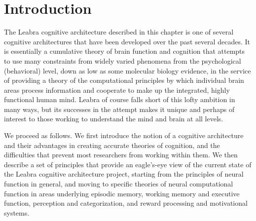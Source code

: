 \documentclass[11pt,twoside]{article}
\begin{document}
 
\titlesamepageoc{\mytitle}{\myauthor}{\mynote}{\myabstract}



\pagestyle{myheadings}

\section{Introduction}

The Leabra cognitive architecture described in this chapter is one of several
cognitive architectures that have been developed over the past several
decades.  It is essentially a cumulative theory of brain function and
cognition that attempts to use many constraints from widely varied phenomena
from the psychological (behavioral) level, down as low as some molecular
biology evidence, in the service of providing a theory of the computational
principles by which individual brain areas process information and cooperate
to make up the integrated, highly functional human mind.  Leabra of course
falls short of this lofty ambition in many ways, but its successes in the
attempt makes it unique and perhaps of interest to those working to understand
the mind and brain at all levels.

We proceed as follows.  We first introduce the notion of a cognitive
architecture and their advantages in creating accurate theories of cognition,
and the difficulties that prevent most researchers from working within them.
We then describe a set of principles that provide an eagle's-eye view of the
current state of the Leabra cognitive architecture project, starting from the
principles of neural function in general, and moving to specific theories of
neural computational function in areas underlying episodic memory, working
memory and executive function, perception and categorization, and reward
processing and motivational systems.
\end{document}
